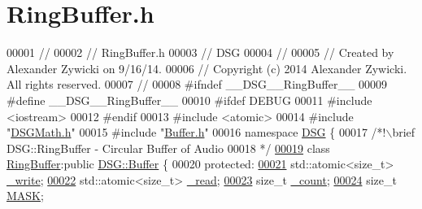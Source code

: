 \hypertarget{_ring_buffer_8h_source}{\section{Ring\+Buffer.\+h}
\label{_ring_buffer_8h_source}
}

\begin{DoxyCode}
00001 \textcolor{comment}{//}
00002 \textcolor{comment}{//  RingBuffer.h}
00003 \textcolor{comment}{//  DSG}
00004 \textcolor{comment}{//}
00005 \textcolor{comment}{//  Created by Alexander Zywicki on 9/16/14.}
00006 \textcolor{comment}{//  Copyright (c) 2014 Alexander Zywicki. All rights reserved.}
00007 \textcolor{comment}{//}
00008 \textcolor{preprocessor}{#ifndef \_\_DSG\_\_RingBuffer\_\_}
00009 \textcolor{preprocessor}{#define \_\_DSG\_\_RingBuffer\_\_}
00010 \textcolor{preprocessor}{#ifdef DEBUG}
00011 \textcolor{preprocessor}{#include <iostream>}
00012 \textcolor{preprocessor}{#endif}
00013 \textcolor{preprocessor}{#include <atomic>}
00014 \textcolor{preprocessor}{#include "\hyperlink{_d_s_g_math_8h}{DSGMath.h}"}
00015 \textcolor{preprocessor}{#include "\hyperlink{_buffer_8h}{Buffer.h}"}
00016 \textcolor{keyword}{namespace }\hyperlink{namespace_d_s_g}{DSG} \{\textcolor{comment}{}
00017 \textcolor{comment}{    /*!\(\backslash\)brief DSG::RingBuffer - Circular Buffer of Audio}
00018 \textcolor{comment}{     */}
\hypertarget{_ring_buffer_8h_source_l00019}{}\hyperlink{class_d_s_g_1_1_ring_buffer}{00019}     \textcolor{keyword}{class }\hyperlink{class_d_s_g_1_1_ring_buffer}{RingBuffer}:\textcolor{keyword}{public} \hyperlink{class_d_s_g_1_1_buffer}{DSG::Buffer} \{
00020     \textcolor{keyword}{protected}:
\hypertarget{_ring_buffer_8h_source_l00021}{}\hyperlink{class_d_s_g_1_1_ring_buffer_a78bd7704fd059b745bc82421e1062123}{00021}         std::atomic<size\_t> \hyperlink{class_d_s_g_1_1_ring_buffer_a78bd7704fd059b745bc82421e1062123}{\_write};
\hypertarget{_ring_buffer_8h_source_l00022}{}\hyperlink{class_d_s_g_1_1_ring_buffer_aa71bb75a5d24700be795a30e1a135a54}{00022}         std::atomic<size\_t> \hyperlink{class_d_s_g_1_1_ring_buffer_aa71bb75a5d24700be795a30e1a135a54}{\_read};
\hypertarget{_ring_buffer_8h_source_l00023}{}\hyperlink{class_d_s_g_1_1_ring_buffer_af6d0e1658a1f1aa298218b890e458f2f}{00023}         \textcolor{keywordtype}{size\_t} \hyperlink{class_d_s_g_1_1_ring_buffer_af6d0e1658a1f1aa298218b890e458f2f}{\_count};
\hypertarget{_ring_buffer_8h_source_l00024}{}\hyperlink{class_d_s_g_1_1_ring_buffer_a2fba2ff6ee3886101f0f58b0fd7f3641}{00024}         \textcolor{keywordtype}{size\_t} \hyperlink{class_d_s_g_1_1_ring_buffer_a2fba2ff6ee3886101f0f58b0fd7f3641}{MASK};

\end{DoxyCode}
